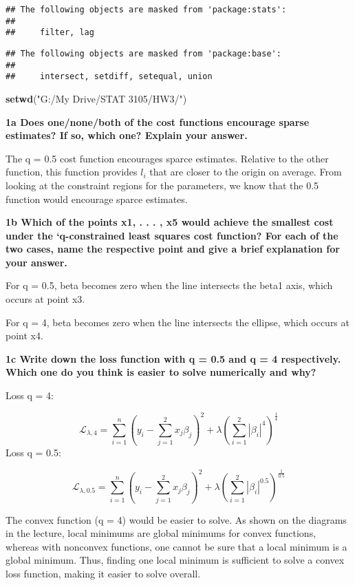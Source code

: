 \documentclass[
]{article}
\newenvironment{Shaded}{\begin{snugshade}}{\end{snugshade}}
\newcommand{\KeywordTok}[1]{\textcolor[rgb]{0.13,0.29,0.53}{\textbf{#1}}}
\newcommand{\NormalTok}[1]{#1}
\newcommand{\StringTok}[1]{\textcolor[rgb]{0.31,0.60,0.02}{#1}}
\begin{document}
\begin{verbatim}
## The following objects are masked from 'package:stats':
## 
##     filter, lag
\end{verbatim}

\begin{verbatim}
## The following objects are masked from 'package:base':
## 
##     intersect, setdiff, setequal, union
\end{verbatim}

\begin{Shaded}
\begin{Highlighting}[]
\KeywordTok{setwd}\NormalTok{(}\StringTok{"G:/My Drive/STAT 3105/HW3/"}\NormalTok{)}
\end{Highlighting}
\end{Shaded}

\textbf{1a Does one/none/both of the cost functions encourage sparse
estimates? If so, which one? Explain your answer.}

The q = 0.5 cost function encourages sparce estimates. Relative to the
other function, this function provides \(l_i\) that are closer to the
origin on average. From looking at the constraint regions for the
parameters, we know that the 0.5 function would encourage sparce
estimates.

\textbf{1b Which of the points x1, . . . , x5 would achieve the smallest
cost under the `q-constrained least squares cost function? For each of
the two cases, name the respective point and give a brief explanation
for your answer. }

For q = 0.5, beta becomes zero when the line intersects the beta1 axis,
which occurs at point x3.

For q = 4, beta becomes zero when the line intersects the ellipse, which
occurs at point x4.

\textbf{1c Write down the loss function with q = 0.5 and q = 4
respectively. Which one do you think is easier to solve numerically and
why?}

Loss q = 4:

\[\mathcal{L}_{\lambda, 4} = \sum_{i = 1}^n (y_i - \sum_{j = 1}^2 x_j\beta_j)^2 + \lambda (\sum_{i = 1}^2 |\beta_i|^{4})^{\frac{1}{4}}\]
Loss q = 0.5:

\[\mathcal{L}_{\lambda, 0.5} = \sum_{i = 1}^n (y_i - \sum_{j = 1}^2 x_j\beta_j)^2 + \lambda (\sum_{i = 1}^2 |\beta_i|^{0.5})^{\frac{1}{0.5}}\]

The convex function (q = 4) would be easier to solve. As shown on the
diagrams in the lecture, local minimums are global minimums for convex
functions, whereas with nonconvex functions, one cannot be sure that a
local minimum is a global minimum. Thus, finding one local minimum is
sufficient to solve a convex loss function, making it easier to solve
overall.
\end{document}
